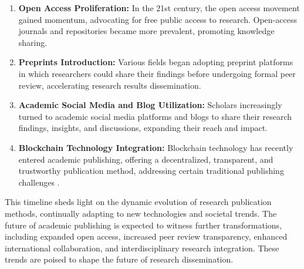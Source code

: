 \documentclass[lettersize,journal]{IEEEtran}
\begin{document}
\begin{enumerate}
  \item \textbf{Open Access Proliferation:} In the 21st century, the open access movement gained momentum, advocating for free public access to research. Open-access journals \cite{swan2012policy} and repositories became more prevalent, promoting knowledge sharing.

  \item \textbf{Preprints Introduction:} Various fields began adopting preprint platforms in which researchers could share their findings before undergoing formal peer review, accelerating research results dissemination.

  \item \textbf{Academic Social Media and Blog Utilization:} Scholars increasingly turned to academic social media platforms and blogs to share their research findings, insights, and discussions, expanding their reach and impact.

  \item \textbf{Blockchain Technology Integration:} Blockchain technology has recently entered academic publishing, offering a decentralized, transparent, and trustworthy publication method, addressing certain traditional publishing challenges \cite{swan2015blockchain} \cite{mougayar2016business}.
\end{enumerate}

This timeline sheds light on the dynamic evolution of research publication methods, continually adapting to new technologies and societal trends. The future of academic publishing is expected to witness further transformations, including expanded open access, increased peer review transparency, enhanced international collaboration, and interdisciplinary research integration. These trends are poised to shape the future of research dissemination.
\end{document}
